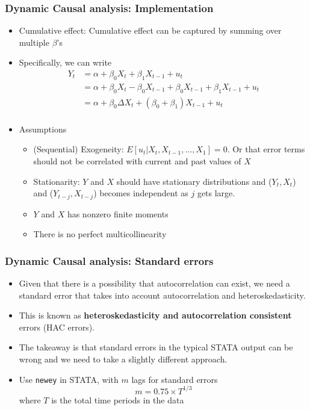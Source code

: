 \documentclass[aspectratio=169]{beamer}
\begin{document}
\begin{frame}
\frametitle{Dynamic Causal analysis: Implementation}

\begin{itemize}
\item Cumulative effect: Cumulative effect can be captured by summing over multiple $\beta$'s
\item Specifically, we can write
\[
\begin{aligned}
Y_t& = \alpha+\beta_0X_t + \beta_1X_{t-1}+u_t\\
&=\alpha +\beta_0 X_t - \beta_0X_{t-1} + \beta_0 X_{t-1} + \beta_1 X_{t-1}+u_t \\
&=\alpha + \beta_0\Delta X_t + (\beta_0 + \beta_1)X_{t-1}+u_t\\
\end{aligned}
\]
\item Assumptions
\begin{itemize}
\item (Sequential) Exogeneity: $E[u_t|X_t, X_{t-1},...,X_1]=0$. Or that error terms should not be correlated with current and past values of $X$
\item Stationarity: $Y$ and $X$ should have stationary distributions and ($Y_t, X_t$) and ($Y_{t-j}, X_{t-j}$) becomes independent as $j$ gets large. 
\item $Y$ and $X$ has nonzero finite moments
\item There is no perfect multicollinearity
\end{itemize}
\end{itemize}
\end{frame}

\begin{frame}
\frametitle{Dynamic Causal analysis: Standard errors}

\begin{itemize}
\item Given that there is a possibility that autocorrelation can exist, we need a standard error that takes into account autocorrelation and heteroskedasticity. 
\item This is known as \textbf{heteroskedasticity and autocorrelation consistent} errors (HAC errors). 
\item The takeaway is that standard errors in the typical STATA output can be wrong and we need to take a slightly different approach.
\item Use \texttt{newey} in STATA, with $m$ lags for standard errors
\[
m = 0.75\times T^{1/3}
\]
where $T$ is the total time periods in the data
\end{itemize}
\end{frame}
\end{document}
